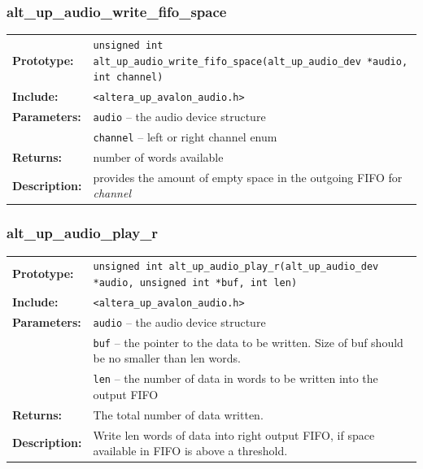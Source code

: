 \subsubsection{alt\_up\_audio\_write\_fifo\_space}
\begin{tabular}[ht]{lp{11cm}}
	\textbf{Prototype:}
	&
	\texttt{unsigned int alt\_up\_audio\_write\_fifo\_space(alt\_up\_audio\_dev *audio, int channel)} 
	\\
	\textbf{Include:}
	&
	{\tt <altera\_up\_avalon\_audio.h>}
	\\
	{\textbf{Parameters:}}
	&
	\texttt{{audio}}
	 -- the audio device structure 
	\\
	&
	\texttt{{channel}}
	 -- left or right channel enum 
	\\
	\textbf{Returns:}
	& number of words available
	\\
	\textbf{Description:}
	& provides the amount of empty space in the outgoing FIFO for {\it channel} \\
\end{tabular}
\vfill

\subsubsection{alt\_up\_audio\_play\_r}
\begin{tabular}[ht]{lp{11cm}}
	\textbf{Prototype:}
	&
	\texttt{unsigned int alt\_up\_audio\_play\_r(alt\_up\_audio\_dev *audio, unsigned int *buf, int len)} 
	\\
	\textbf{Include:}
	&
	{\tt <altera\_up\_avalon\_audio.h>}
	\\
	{\textbf{Parameters:}}
	&
	\texttt{{audio}}
	 -- the audio device structure 
	\\
	&
	\texttt{{buf}}
	 -- the pointer to the data to be written. Size of buf should be no smaller than len words. 
	\\
	&
	\texttt{{len}}
	 -- the number of data in words to be written into the output FIFO 
	\\
	\textbf{Returns:}
	& The total number of data written.
	\\
	\textbf{Description:}
	& Write len words of data into right output FIFO, if space available in FIFO is above a threshold.\\
\end{tabular}
\vfill

